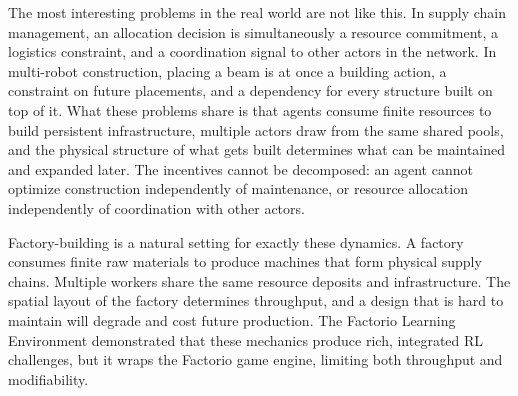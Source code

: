 \documentclass{article}
\begin{document}
The most interesting problems in the real world are not like this.
In supply chain management, an allocation decision is simultaneously a resource commitment, a logistics constraint, and a coordination signal to other actors in the network.
In multi-robot construction, placing a beam is at once a building action, a constraint on future placements, and a dependency for every structure built on top of it.
What these problems share is that agents consume finite resources to build persistent infrastructure, multiple actors draw from the same shared pools, and the physical structure of what gets built determines what can be maintained and expanded later.
The incentives cannot be decomposed: an agent cannot optimize construction independently of maintenance, or resource allocation independently of coordination with other actors.

Factory-building is a natural setting for exactly these dynamics.
A factory consumes finite raw materials to produce machines that form physical supply chains.
Multiple workers share the same resource deposits and infrastructure.
The spatial layout of the factory determines throughput, and a design that is hard to maintain will degrade and cost future production.
The Factorio Learning Environment demonstrated that these mechanics produce rich, integrated RL challenges, but it wraps the Factorio game engine, limiting both throughput and modifiability.

\end{document}
